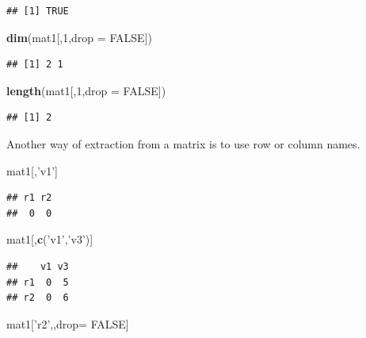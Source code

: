 \documentclass[]{book}
\newenvironment{Shaded}{\begin{snugshade}}{\end{snugshade}}
\newcommand{\KeywordTok}[1]{\textcolor[rgb]{0.13,0.29,0.53}{\textbf{{#1}}}}
\newcommand{\DataTypeTok}[1]{\textcolor[rgb]{0.13,0.29,0.53}{{#1}}}
\newcommand{\DecValTok}[1]{\textcolor[rgb]{0.00,0.00,0.81}{{#1}}}
\newcommand{\StringTok}[1]{\textcolor[rgb]{0.31,0.60,0.02}{{#1}}}
\newcommand{\OtherTok}[1]{\textcolor[rgb]{0.56,0.35,0.01}{{#1}}}
\newcommand{\NormalTok}[1]{{#1}}
\theoremstyle{definition}
\theoremstyle{definition}
\theoremstyle{remark}
\begin{document}
\begin{verbatim}
## [1] TRUE
\end{verbatim}

\begin{Shaded}
\begin{Highlighting}[]
\KeywordTok{dim}\NormalTok{(mat1[,}\DecValTok{1}\NormalTok{,}\DataTypeTok{drop =} \OtherTok{FALSE}\NormalTok{])}
\end{Highlighting}
\end{Shaded}

\begin{verbatim}
## [1] 2 1
\end{verbatim}

\begin{Shaded}
\begin{Highlighting}[]
\KeywordTok{length}\NormalTok{(mat1[,}\DecValTok{1}\NormalTok{,}\DataTypeTok{drop =} \OtherTok{FALSE}\NormalTok{])  }
\end{Highlighting}
\end{Shaded}

\begin{verbatim}
## [1] 2
\end{verbatim}

Another way of extraction from a matrix is to use row or column names.

\begin{Shaded}
\begin{Highlighting}[]
\NormalTok{mat1[,}\StringTok{'v1'}\NormalTok{]}
\end{Highlighting}
\end{Shaded}

\begin{verbatim}
## r1 r2 
##  0  0
\end{verbatim}

\begin{Shaded}
\begin{Highlighting}[]
\NormalTok{mat1[,}\KeywordTok{c}\NormalTok{(}\StringTok{'v1'}\NormalTok{,}\StringTok{'v3'}\NormalTok{)]}
\end{Highlighting}
\end{Shaded}

\begin{verbatim}
##    v1 v3
## r1  0  5
## r2  0  6
\end{verbatim}

\begin{Shaded}
\begin{Highlighting}[]
\NormalTok{mat1[}\StringTok{'r2'}\NormalTok{,,drop=}\StringTok{ }\OtherTok{FALSE}\NormalTok{]}
\end{Highlighting}
\end{Shaded}
\end{document}
